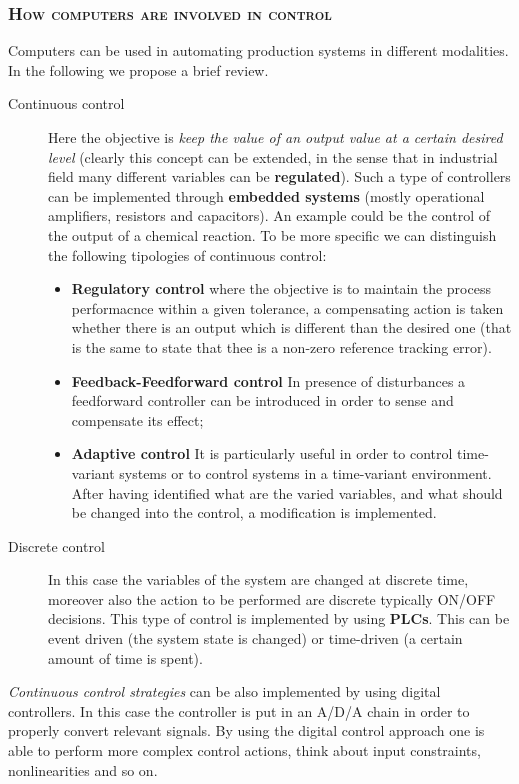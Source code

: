 \subsubsection{\textsc{How computers are involved in control}}
Computers can be used in automating production systems in different modalities. In the following we propose a brief review.
\begin{description}
    \item[\textsf{Continuous control}] Here the objective is \textit{keep the value of an output value at a certain desired level} (clearly this concept can be extended, in the sense that in industrial field many different variables can be \textbf{regulated}). Such a type of controllers can be implemented through \textbf{embedded systems} (mostly operational amplifiers, resistors and capacitors). An example could be the control of the output of a chemical reaction. To be more specific we can distinguish the following tipologies of continuous control: 
    \begin{itemize}
        \itemsep-0.3em
        \item \textbf{Regulatory control} where the objective is to maintain the process performacnce within a given tolerance, a compensating action is taken whether there is an output which is different than the desired one (that is the same to state that thee is a non-zero reference tracking error).
        \item \textbf{Feedback-Feedforward control} In presence of disturbances a feedforward controller can be introduced in order to sense and compensate its effect;
        \item \textbf{Adaptive control} It is particularly useful in order to control time-variant systems or to control systems in a time-variant environment. After having identified what are the varied variables, and what should be changed into the control, a modification is implemented.
    \end{itemize}
    \item[\textsf{Discrete control}] In this case the variables of the system are changed at discrete time, moreover also the action to be performed are discrete typically ON/OFF decisions. This type of control is implemented by using \textbf{PLCs}. This can be event driven (the system state is changed) or time-driven (a certain amount of time is spent).
\end{description}

\begin{remark} 
    \textit{Continuous control strategies} can be also implemented by using digital controllers. In this case the controller is put in an A/D/A chain in order to properly convert relevant signals. By using the digital control approach one is able to perform more complex control actions, think about input constraints, nonlinearities and so on.
\end{remark}

